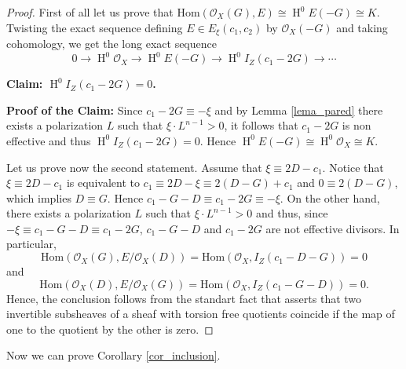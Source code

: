 \documentclass[11pt,twoside]{amsart}
\theoremstyle{definition}
\newcommand {\Hom}{\mathrm{Hom}}
\newcommand{\Ho}{\operatorname{H}}
\begin{document}
\begin{proof}
    First of all let us prove that $\Hom(\mathcal{O}_X(G), E)\cong \Ho^0E(-G)\cong K$.
    Twisting the exact sequence defining $E\in E_{\xi}(c_1,c_2)$ by $\mathcal{O}_X(-G)$ and taking cohomology, we get the long exact sequence
    $$0\rightarrow \Ho^0\mathcal{O}_X\rightarrow \Ho^0E(-G)\rightarrow \Ho^0I_Z(c_1-2G) \rightarrow\cdots$$

\noindent    \textbf{Claim: $\Ho^0I_Z(c_1-2G)=0$.}
    
  \noindent  \textbf{Proof of the Claim:}
    Since $c_1-2G\equiv -\xi$ and by Lemma \ref{lema_pared} there exists a polarization $L$ such that $\xi\cdot L^{n-1}>0$, it follows that $c_1-2G$ is non effective and thus  $\Ho^0I_Z(c_1-2G)=0$.
    Hence $\Ho^0E(-G)\cong \Ho^0\mathcal{O}_X\cong K$.

    Let us prove now the second statement. Assume that $\xi\equiv 2D-c_1$.
    Notice that $\xi\equiv 2D-c_1$ is equivalent to $c_1\equiv 2D-\xi\equiv 2(D-G)+c_1$ and $0\equiv 2(D-G)$, which implies $D\equiv G$. Hence $c_1-G-D\equiv c_1-2G\equiv-\xi$.
On the other hand, there exists a polarization $L$ such that $\xi\cdot L^{n-1}>0$ and thus, since $-\xi\equiv c_1-G-D\equiv c_1-2G$,  $c_1-G-D$ and $ c_1-2G$ are not effective divisors. 
In particular, $$\Hom(\mathcal{O}_X(G), E/\mathcal{O}_X(D))=\Hom(\mathcal{O}_X,I_Z(c_1-D-G))=0$$
and $$\Hom(\mathcal{O}_X(D), E/\mathcal{O}_X(G))=\Hom(\mathcal{O}_X,I_Z(c_1-G-D))=0.$$
Hence, the conclusion follows from the standart fact that asserts that two invertible subsheaves of a sheaf with torsion free quotients coincide if the map of one to the quotient by the other is zero.
\end{proof}


Now we can prove Corollary \ref{cor_inclusion}.
\end{document}
